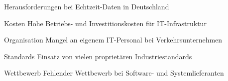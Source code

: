 
\begin{frame}{Herausforderungen bei Echtzeit-Daten in Deutschland}
  \begin{block}{Kosten}
    Hohe Betriebs- und Investitionskosten für IT-Infrastruktur
  \end{block}

  \begin{block}{Organisation}
    Mangel an eigenem IT-Personal bei Verkehrsunternehmen
  \end{block}

  \begin{block}{Standards}
    Einsatz von vielen proprietären Industriestandards
  \end{block}

  \begin{block}{Wettbewerb}
    Fehlender Wettbewerb bei Software- und Systemlieferanten
  \end{block}
\end{frame}

